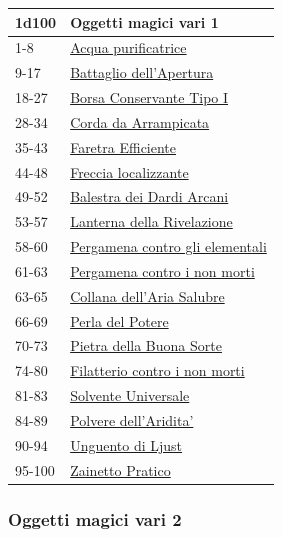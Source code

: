 \begin{multicols}{2}
{{\small\begin{tabularx}{\linewidth}{ll}
		\toprule
\textbf{1d100} & \textbf{Oggetti magici vari 1}\\
\toprule
1-8 & \hyperlink{Acqua purificatrice}{Acqua purificatrice}\\
9-17 & \hyperlink{Battaglio dell'Apertura}{Battaglio dell'Apertura}\\
18-27 & \hyperlink{Borsa Conservante TipoI}{Borsa Conservante Tipo I}\\
28-34 & \hyperlink{Corda da Arrampicata}{Corda da Arrampicata}\\
35-43 & \hyperlink{Faretra Efficiente}{Faretra Efficiente}\\
44-48 & \hyperlink{Freccia localizzante}{Freccia localizzante}\\
49-52 & \hyperlink{Balestra dei Dardi Arcani}{Balestra dei Dardi Arcani}\\
53-57 & \hyperlink{Lanterna della Rivelazione}{Lanterna della Rivelazione}\\
58-60 & \hyperlink{Pergamena contro gli elementali}{Pergamena contro gli elementali}\\
61-63 & \hyperlink{Pergamena contro i nonmorti}{Pergamena contro i non morti}\\
63-65 & \hyperlink{Collana dell'Aria Salubre}{Collana dell'Aria Salubre}\\
66-69 & \hyperlink{Perla del Potere}{Perla del Potere}\\
70-73 & \hyperlink{Pietra della Buona Sorte}{Pietra della Buona Sorte}\\
74-80 & \hyperlink{Filatterio contro i nonmorti}{Filatterio contro i non morti}\\
81-83 & \hyperlink{Solvente Universale}{Solvente Universale}\\
84-89 & \hyperlink{Polvere dell'Aridita'}{Polvere dell'Aridita'}\\
90-94 & \hyperlink{Unguento di Ljust}{Unguento di Ljust}\\
95-100 & \hyperlink{Zainetto Pratico}{Zainetto Pratico}
\end{tabularx}}

\subsubsection{Oggetti magici vari 2}\hypertarget{Oggetti Magici Vari 2}{}

}
\end{multicols}
